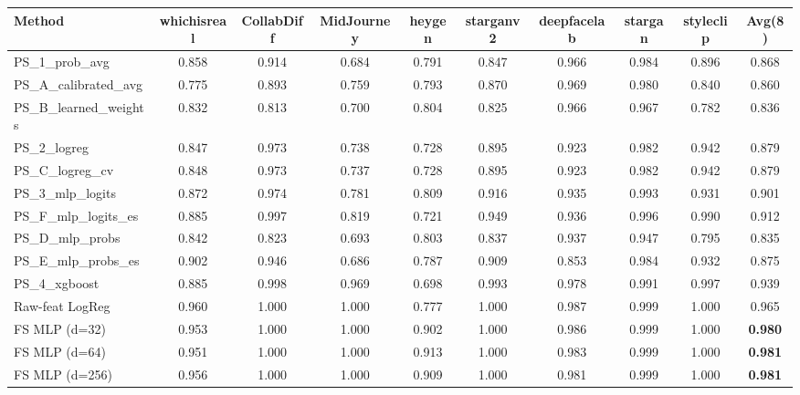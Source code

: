 \begin{tabular}{lccccccccc}
\toprule
Method & whichisreal & CollabDiff & MidJourney & heygen & starganv2 & deepfacelab & stargan & styleclip & Avg(8) \\
\midrule
PS\_1\_prob\_avg & 0.858 & 0.914 & 0.684 & 0.791 & 0.847 & 0.966 & 0.984 & 0.896 & 0.868 \\
PS\_A\_calibrated\_avg & 0.775 & 0.893 & 0.759 & 0.793 & 0.870 & 0.969 & 0.980 & 0.840 & 0.860 \\
PS\_B\_learned\_weights & 0.832 & 0.813 & 0.700 & 0.804 & 0.825 & 0.966 & 0.967 & 0.782 & 0.836 \\
PS\_2\_logreg & 0.847 & 0.973 & 0.738 & 0.728 & 0.895 & 0.923 & 0.982 & 0.942 & 0.879 \\
PS\_C\_logreg\_cv & 0.848 & 0.973 & 0.737 & 0.728 & 0.895 & 0.923 & 0.982 & 0.942 & 0.879 \\
PS\_3\_mlp\_logits & 0.872 & 0.974 & 0.781 & 0.809 & 0.916 & 0.935 & 0.993 & 0.931 & 0.901 \\
PS\_F\_mlp\_logits\_es & 0.885 & 0.997 & 0.819 & 0.721 & 0.949 & 0.936 & 0.996 & 0.990 & 0.912 \\
PS\_D\_mlp\_probs & 0.842 & 0.823 & 0.693 & 0.803 & 0.837 & 0.937 & 0.947 & 0.795 & 0.835 \\
PS\_E\_mlp\_probs\_es & 0.902 & 0.946 & 0.686 & 0.787 & 0.909 & 0.853 & 0.984 & 0.932 & 0.875 \\
PS\_4\_xgboost & 0.885 & 0.998 & 0.969 & 0.698 & 0.993 & 0.978 & 0.991 & 0.997 & 0.939 \\
\midrule
Raw-feat LogReg & 0.960 & 1.000 & 1.000 & 0.777 & 1.000 & 0.987 & 0.999 & 1.000 & 0.965 \\
FS MLP (d=32) & 0.953 & 1.000 & 1.000 & 0.902 & 1.000 & 0.986 & 0.999 & 1.000 & \textbf{0.980} \\
FS MLP (d=64) & 0.951 & 1.000 & 1.000 & 0.913 & 1.000 & 0.983 & 0.999 & 1.000 & \textbf{0.981} \\
FS MLP (d=256) & 0.956 & 1.000 & 1.000 & 0.909 & 1.000 & 0.981 & 0.999 & 1.000 & \textbf{0.981} \\
\bottomrule
\end{tabular}